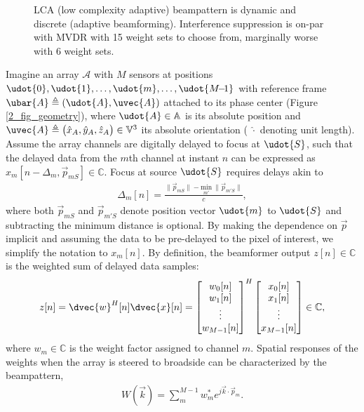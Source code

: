 {\begin{figure}[tp]
\caption{LCA (low complexity adaptive) beampattern is dynamic and discrete (adaptive beamforming). Interference suppression is on-par with MVDR with 15 weight sets to choose from, marginally worse with 6 weight sets.}%
\label{2_fig_scenario_lca}
\end{figure}

Imagine an array $\mathcal{A}$ with $M$ sensors at positions $\udot{0},\udot{1},\dots, \udot{m}, \dots, \udot{M{\!-\!1}}$ with reference frame $\ubar{A} \triangleq (\udot{A},\uvec{A})$ attached to its phase center (Figure \ref{2_fig_geometry}), where $\udot{A}\in\mathbb{A}$ is its absolute position and $\uvec{A}\triangleq\big(\hat{x}_{A},\hat{y}_{A},\hat{z}_{A}\big)\in\mathbb{V}^3$ its absolute orientation ( $\hat{\cdot}$ denoting unit length). Assume the array channels are digitally delayed to focus at $\udot{S}$, such that the delayed data from the $m$th channel at instant $n$ can be expressed as $x_m[n-\Delta_m, \vec{p}_{mS}]\in\mathbb{C}$. Focus at source $\udot{S}$ requires delays akin to
%
\begin{align}
\Delta_m[n] = \frac{\lVert \vec{p}_{mS}\rVert - \underset{m'}{\mathrm{min}}\ \lVert \vec{p}_{m'S}\rVert}{c},\label{2_eq_delta}
\end{align}
%
where both $\vec{p}_{mS}$ and $\vec{p}_{m'S}$ denote position vector $\udot{m}$ to $\udot{S}$ and subtracting the minimum distance is optional. By making the dependence on $\vec{p}$ implicit and assuming the data to be pre-delayed to the pixel of interest, we simplify the notation to $x_m[n]$. By definition, the beamformer output $z[n]\in\mathbb{C}$ is the weighted sum of delayed data samples:
%
\begin{align}
z[n] = \dvec{w}^H[n]\dvec{x}[n] = \bmat{w_0[n]\\w_1[n]\\\vdots\\w_{M-1}[n]}^H \bmat{x_0[n]\\x_1[n]\\\vdots\\x_{M-1}[n]} \in\mathbb{C},\label{2_eq_z}
\end{align}
%
where $w_m\in\mathbb{C}$ is the weight factor assigned to channel $m$. Spatial responses of the weights when the array is steered to broadside can be characterized by the beampattern,
%
\begin{align}
W(\vec{k}) = \sum_m^{M-1} w_m^* e^{j\vec k \cdot \vec{p}_m}.\label{2_eq_beampattern}

\end{align}}
